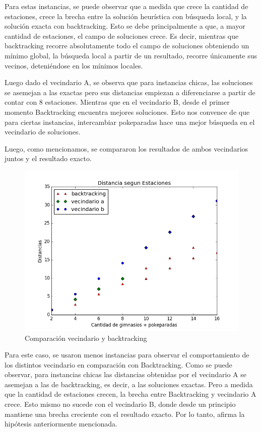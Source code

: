 \par Para estas instancias, se puede observar que a medida que crece la cantidad de estaciones, crece la brecha entre la solución heurística con búsqueda local, y la solución exacta con backtracking. Esto se debe principalmente a que, a mayor cantidad de estaciones, el campo de soluciones crece. Es decir, mientras que backtracking recorre absolutamente todo el campo de soluciones obteniendo un mínimo global, la búsqueda local a partir de un resultado, recorre únicamente sus vecinos, deteniéndose en los mínimos locales. 

\par Luego dado el vecindario A, se observa que para instancias chicas, las soluciones se asemejan a las exactas pero sus distancias empiezan a diferenciarse a partir de contar con 8 estaciones. Mientras que en el vecindario B, desde el primer momento Backtracking encuentra mejores soluciones. Esto nos convence de que  para ciertas instancias, intercambiar pokeparadas hace una mejor búsqueda en el vecindario de soluciones. 

Luego, como mencionamos, se compararon los resultados de ambos vecindarios juntos y el resultado exacto.

  \begin{figure}[H]
      \begin{center}
        \includegraphics[width=0.7\columnwidth]{imagenes/Ej3/Exp2Ej3TODO.png}
        \caption{Comparación vecindario y backtracking}
      \end{center}
  \end{figure}


Para este caso, se usaron menos instancias para observar el comportamiento de los distintos vecindario en comparación con Backtracking.  Como se puede observar, para instancias chicas las distancias obtenidas por el vecindario A se asemejan a las de backtracking, es decir, a las soluciones exactas. Pero a medida que la cantidad de estaciones crecen, la brecha entre Backtracking y vecindario A crece. Esto mismo no sucede con el vecindario B, donde desde un principio mantiene una brecha creciente con el resultado exacto. Por lo tanto, afirma la hipótesis anteriormente mencionada.

